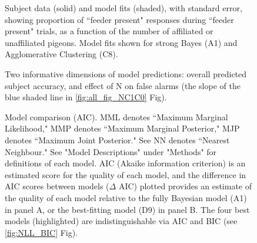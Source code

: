 \documentclass{article}
\begin{document}
\begin{figure}[ht]
\begin{center}
   \caption{Subject data (solid) and model fits (shaded), with standard error, showing proportion of ``feeder present" responses during ``feeder present" trials, as a function of the number of affiliated or unaffiliated pigeons. Model fits shown for strong Bayes (A1) and Agglomerative Clustering (C8).} 
   \label{fig:N}
\end{center}
\end{figure}




\begin{figure}[ht]
\begin{center}
   \caption{Two informative dimensions of model predictions: overall predicted subject accuracy, and effect of N on false alarms (the slope of the blue shaded line in
   \ref{fig:all_fig_NC1C0} Fig).}
   \label{fig:slopeaccuracy}
\end{center}
\end{figure}

\begin{figure}[ht]
\begin{center}
\hspace*{-2cm}
   \caption{Model comparison (AIC). MML denotes ``Maximum Marginal Likelihood," MMP denotes ``Maximum Marginal Posterior," MJP denotes ``Maximum Joint Posterior." See  NN denotes ``Nearest Neighbour." See "Model Descriptions" under "Methods" for definitions of each model. AIC (Akaike information criterion) is an estimated score for the quality of each model, and the difference in AIC scores between models ($\Delta$ AIC) plotted provides an estimate of the quality of each model relative to the fully Bayesian model (A1) in panel A, or the best-fitting model (D9) in panel B. The four best models (highlighted) are indistinguishable via AIC and BIC (see \ref{fig:NLL_BIC} Fig).} 
   \label{fig:NLL_AIC}
\end{center}
\end{figure}
\end{document}
